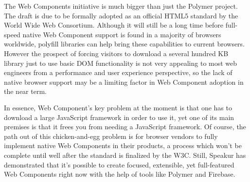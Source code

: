 The Web Components initiative is much bigger than just the Polymer project.
The draft is due to be formally adopted as an official HTML5 standard by the World Wide Web Consortium.
Although it will still be a long time before full-speed native Web Component support is found in a majority of browsers worldwide, 
polyfill libraries can help bring these capabilities to current browsers.
However the prospect of forcing visitors to download a several hundred KB library just to use basic DOM functionality is not very appealing to most web engineers from a performance and user experience perspective, 
so the lack of native browser support may be a limiting factor in Web Component adoption in the near term.

In essence, Web Component's key problem at the moment is that one has to download a large JavaScript framework in order to use it, 
yet one of its main premises is that it frees you from needing a JavaScript framework.
Of course, the path out of this chicken-and-egg problem is for browser vendors to fully implement native Web Components in their products,
a process which won't be complete until well after the standard is finalized by the W3C.
Still, Speakur has demonstrated that it's possible to create focused, extensible, yet full-featured Web Components right now with the help of tools like Polymer and Firebase.